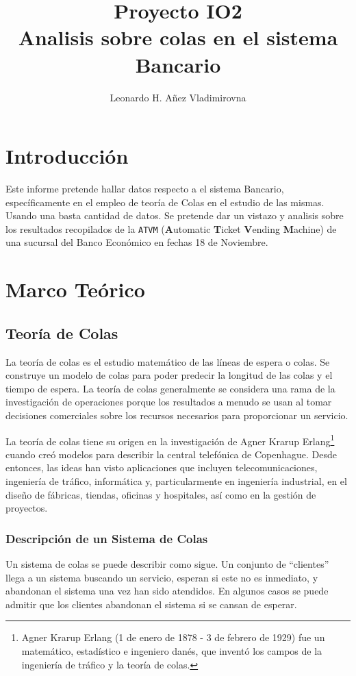 \documentclass[10pt,letterpaper]{report}
\author{Leonardo H. Añez Vladimirovna}
\title{Proyecto IO2\\Analisis sobre colas en el sistema Bancario}
\begin{document}
\maketitle
\section*{Introducción}
Este informe pretende hallar datos respecto a el sistema Bancario, específicamente en el empleo de teoría de Colas en el estudio de las mismas. Usando una basta cantidad de datos. Se pretende dar un vistazo y analisis sobre los resultados recopilados de la \texttt{ATVM} (\textbf{A}utomatic \textbf{T}icket \textbf{V}ending \textbf{M}achine) de una sucursal del Banco Económico en fechas 18 de Noviembre.
\section*{Marco Teórico}
\subsection*{Teoría de Colas}
La teoría de colas es el estudio matemático de las líneas de espera o colas. Se construye un modelo de colas para poder predecir la longitud de las colas y el tiempo de espera. La teoría de colas generalmente se considera una rama de la investigación de operaciones porque los resultados a menudo se usan al tomar decisiones comerciales sobre los recursos necesarios para proporcionar un servicio.

La teoría de colas tiene su origen en la investigación de Agner Krarup Erlang\footnote{Agner Krarup Erlang (1 de enero de 1878 - 3 de febrero de 1929) fue un matemático, estadístico e ingeniero danés, que inventó los campos de la ingeniería de tráfico y la teoría de colas.} cuando creó modelos para describir la central telefónica de Copenhague. Desde entonces, las ideas han visto aplicaciones que incluyen telecomunicaciones, ingeniería de tráfico, informática y, particularmente en ingeniería industrial, en el diseño de fábricas, tiendas, oficinas y hospitales, así como en la gestión de proyectos.
\subsubsection*{Descripción de un Sistema de Colas}
Un sistema de colas se puede describir como sigue. Un conjunto de ``clientes'' llega  a  un  sistema buscando  un  servicio,  esperan  si  este  no  es  inmediato,  y  abandonan  el  sistema  una  vez  han  sido  atendidos.  En  algunos  casos  se  puede  admitir que los clientes abandonan el sistema si se cansan de esperar.
\end{document}
